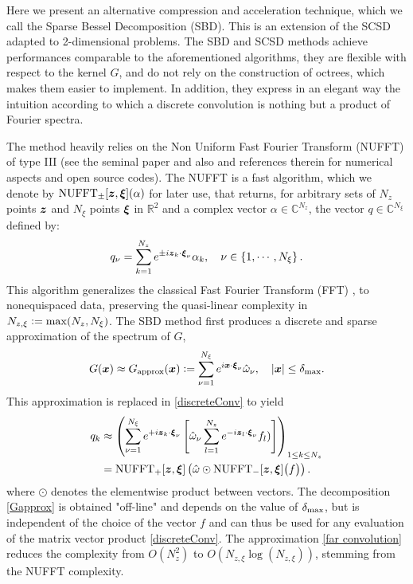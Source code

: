 \documentclass[smallextended]{svjour3}
\begin{document}
Here we present an alternative compression and acceleration technique, which we call the Sparse Bessel Decomposition (SBD). This is an extension of the SCSD adapted to 2-dimensional problems. The SBD and SCSD methods achieve performances comparable to the aforementioned algorithms, they are flexible with respect to the kernel $G$, and do not rely on the construction of octrees, which makes them easier to implement. In addition, they express in an elegant way the intuition according to which a discrete convolution is nothing but a product of Fourier spectra. 

The method heavily relies on the Non Uniform Fast Fourier Transform (NUFFT) of type III (see the seminal paper \cite{NuFFT} and also \cite{greengard2004accelerating,poplau2006calculation} and references therein for numerical aspects and open source codes).  The NUFFT is a fast algorithm, which we denote by $\operatorname{NUFFT}_\pm[\boldsymbol{z},\boldsymbol{\xi}](\alpha)$ for later use, that returns, for arbitrary sets of $N_z$ points $\boldsymbol{z}$ and $N_\xi$ points $\boldsymbol{\xi}$ in $\mathbb{R}^2$ and a complex vector $\alpha  \in \mathbb{C}^{N_z}$, the vector $q \in \mathbb{C}^{N_\xi}$ defined by:
\[ q_\nu = \sum_{k = 1}^{N_z} e^{\pm i \boldsymbol{z}_k \cdot \boldsymbol{\xi}_\nu} \alpha_k, \quad \nu \in \left\{1,\cdots,N_\xi \right\}.\]
This algorithm generalizes the classical Fast Fourier Transform (FFT) \cite{cooley1965algorithm}, to nonequispaced data, preserving the quasi-linear complexity in $N_{z,\xi} \mathrel{\mathop:}= \max(N_z,N_\xi)$.
The SBD method first produces a discrete and sparse approximation of the spectrum of $G$,
\begin{equation}
	\label{Gapprox}
	G(\boldsymbol{x}) \approx G_{\text{approx}}(\boldsymbol{x}) \mathrel{\mathop:}= \sum_{\nu=1}^{N_\xi} e^{i  \boldsymbol{x}\cdot \boldsymbol{\xi}_\nu} \hat{\omega}_\nu, \quad \left\lvert \boldsymbol{x} \right\rvert \leq \delta_{\max}.
\end{equation}
This approximation is replaced in \eqref{discreteConv} to yield 
\begin{equation}
	\begin{split}	q_{k} &\approx \left(\sum_{\nu = 1}^{N_\xi} e^{+i  \boldsymbol{z}_k  \cdot\boldsymbol{\xi}_\nu } \left[\hat{\omega}_\nu \sum_{l=1}^{N_z} e^{- i \boldsymbol{z}_l \cdot \boldsymbol{\xi}_\nu} f_l) \right]\right)_{1 \leq k \leq N_z}\\
		&= \operatorname{NUFFT}_+[\boldsymbol{z},\boldsymbol{\xi}]\left(\hat{\omega} \odot \operatorname{NUFFT}_-[\boldsymbol{z},\boldsymbol{\xi}]\big(f\big)\right).
	\end{split}
	\label{far convolution}					
\end{equation}
where $\odot$ denotes the elementwise product between vectors. The decomposition \eqref{Gapprox} is obtained "off-line" and depends on the value of $\delta_{\max}$, but is independent of the choice of the vector $f$ and can thus be used for any evaluation of the matrix vector product \eqref{discreteConv}. 
The approximation \eqref{far convolution} reduces the complexity from $O(N_z^2)$ to $O(N_{z,\xi}\log (N_{z,\xi}))$, stemming from the NUFFT complexity.
\end{document}
